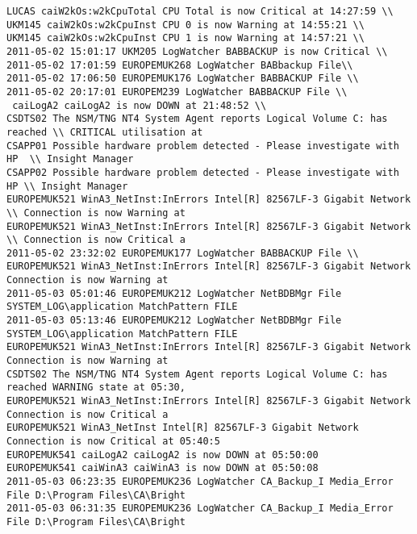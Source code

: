 \begin{lstlisting}
LUCAS caiW2kOs:w2kCpuTotal CPU Total is now Critical at 14:27:59 \\
UKM145 caiW2kOs:w2kCpuInst CPU 0 is now Warning at 14:55:21 \\
UKM145 caiW2kOs:w2kCpuInst CPU 1 is now Warning at 14:57:21 \\
2011-05-02 15:01:17 UKM205 LogWatcher BABBACKUP is now Critical \\
2011-05-02 17:01:59 EUROPEMUK268 LogWatcher BABbackup File\\ 
2011-05-02 17:06:50 EUROPEMUK176 LogWatcher BABBACKUP File \\ 
2011-05-02 20:17:01 EUROPEM239 LogWatcher BABBACKUP File \\ 
 caiLogA2 caiLogA2 is now DOWN at 21:48:52 \\
CSDTS02 The NSM/TNG NT4 System Agent reports Logical Volume C: has reached \\ CRITICAL utilisation at
CSAPP01 Possible hardware problem detected - Please investigate with HP  \\ Insight Manager
CSAPP02 Possible hardware problem detected - Please investigate with HP \\ Insight Manager
EUROPEMUK521 WinA3_NetInst:InErrors Intel[R] 82567LF-3 Gigabit Network \\ Connection is now Warning at
EUROPEMUK521 WinA3_NetInst:InErrors Intel[R] 82567LF-3 Gigabit Network \\ Connection is now Critical a
2011-05-02 23:32:02 EUROPEMUK177 LogWatcher BABBACKUP File \\
EUROPEMUK521 WinA3_NetInst:InErrors Intel[R] 82567LF-3 Gigabit Network Connection is now Warning at
2011-05-03 05:01:46 EUROPEMUK212 LogWatcher NetBDBMgr File SYSTEM_LOG\application MatchPattern FILE
2011-05-03 05:13:46 EUROPEMUK212 LogWatcher NetBDBMgr File SYSTEM_LOG\application MatchPattern FILE
EUROPEMUK521 WinA3_NetInst:InErrors Intel[R] 82567LF-3 Gigabit Network Connection is now Warning at
CSDTS02 The NSM/TNG NT4 System Agent reports Logical Volume C: has reached WARNING state at 05:30,
EUROPEMUK521 WinA3_NetInst:InErrors Intel[R] 82567LF-3 Gigabit Network Connection is now Critical a
EUROPEMUK521 WinA3_NetInst Intel[R] 82567LF-3 Gigabit Network Connection is now Critical at 05:40:5
EUROPEMUK541 caiLogA2 caiLogA2 is now DOWN at 05:50:00
EUROPEMUK541 caiWinA3 caiWinA3 is now DOWN at 05:50:08
2011-05-03 06:23:35 EUROPEMUK236 LogWatcher CA_Backup_I Media_Error File D:\Program Files\CA\Bright
2011-05-03 06:31:35 EUROPEMUK236 LogWatcher CA_Backup_I Media_Error File D:\Program Files\CA\Bright

\end{lstlisting}
